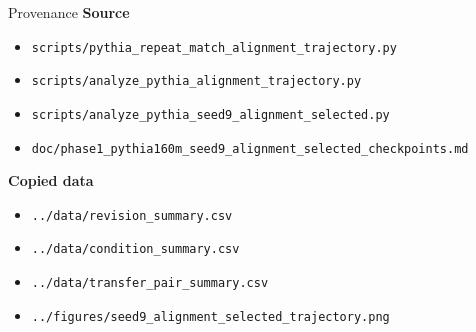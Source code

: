 \documentclass[aspectratio=169]{beamer}
\begin{document}
\begin{frame}{Provenance}
  \small
  \textbf{Source}
  \begin{itemize}
    \item \texttt{scripts/pythia\_repeat\_match\_alignment\_trajectory.py}
    \item \texttt{scripts/analyze\_pythia\_alignment\_trajectory.py}
    \item \texttt{scripts/analyze\_pythia\_seed9\_alignment\_selected.py}
    \item \texttt{doc/phase1\_pythia160m\_seed9\_alignment\_selected\_checkpoints.md}
  \end{itemize}

  \vspace{0.4em}
  \textbf{Copied data}
  \begin{itemize}
    \item \texttt{../data/revision\_summary.csv}
    \item \texttt{../data/condition\_summary.csv}
    \item \texttt{../data/transfer\_pair\_summary.csv}
    \item \texttt{../figures/seed9\_alignment\_selected\_trajectory.png}
  \end{itemize}
\end{frame}
\end{document}
